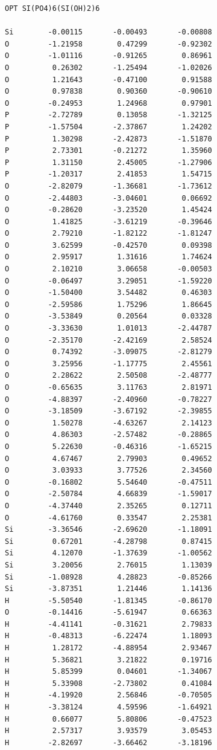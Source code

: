 \documentclass[
  digital, %
  table,   %
  lof,     %
  lot,     %
]{fithesis3}
\begin{document}
\begin{lstlisting}[frame=single, caption={\ce{(Si(PO4)6(Si(OH)2)6)^{2-}}},label=DescriptiveLabel]
OPT SI(PO4)6(SI(OH)2)6

Si        -0.00115       -0.00493       -0.00808
O         -1.21958        0.47299       -0.92302
O         -1.01116       -0.91265        0.86961
O          0.26302       -1.25494       -1.02026
O          1.21643       -0.47100        0.91588
O          0.97838        0.90360       -0.90610
O         -0.24953        1.24968        0.97901
P         -2.72789        0.13058       -1.32125
P         -1.57504       -2.37867        1.24202
P          1.30298       -2.42873       -1.51870
P          2.73301       -0.21272        1.35960
P          1.31150        2.45005       -1.27906
P         -1.20317        2.41853        1.54715
O         -2.82079       -1.36681       -1.73612
O         -2.44803       -3.04601        0.06692
O         -0.28620       -3.23520        1.45424
O          1.41825       -3.61219       -0.39646
O          2.79210       -1.82122       -1.81247
O          3.62599       -0.42570        0.09398
O          2.95917        1.31616        1.74624
O          2.10210        3.06658       -0.00503
O         -0.06497        3.29051       -1.59220
O         -1.50400        3.54482        0.46303
O         -2.59586        1.75296        1.86645
O         -3.53849        0.20564        0.03328
O         -3.33630        1.01013       -2.44787
O         -2.35170       -2.42169        2.58524
O          0.74392       -3.09075       -2.81279
O          3.25956       -1.17775        2.45561
O          2.28622        2.50508       -2.48777
O         -0.65635        3.11763        2.81971
O         -4.88397       -2.40960       -0.78227
O         -3.18509       -3.67192       -2.39855
O          1.50278       -4.63267        2.14123
O          4.86303       -2.57482       -0.28865
O          5.22630       -0.46316       -1.65215
O          4.67467        2.79903        0.49652
O          3.03933        3.77526        2.34560
O         -0.16802        5.54640       -0.47511
O         -2.50784        4.66839       -1.59017
O         -4.37440        2.35265        0.12711
O         -4.61760        0.33547        2.25381
Si        -3.36546       -2.69620       -1.18091
Si         0.67201       -4.28798        0.87415
Si         4.12070       -1.37639       -1.00562
Si         3.20056        2.76015        1.13039
Si        -1.08928        4.28823       -0.85266
Si        -3.87351        1.21446        1.14136
H         -5.50540       -1.81345       -0.86170
O         -0.14416       -5.61947        0.66363
H         -4.41141       -0.31621        2.79833
H         -0.48313       -6.22474        1.18093
H          1.28172       -4.88954        2.93467
H          5.36821        3.21822        0.19716
H          5.85399        0.04601       -1.34067
H          5.33908       -2.73802        0.41084
H         -4.19920        2.56846       -0.70505
H         -3.38124        4.59596       -1.64921
H          0.66077        5.80806       -0.47523
H          2.57317        3.93579        3.05453
H         -2.82697       -3.66462       -3.18196
 \end{lstlisting}
\end{document}
